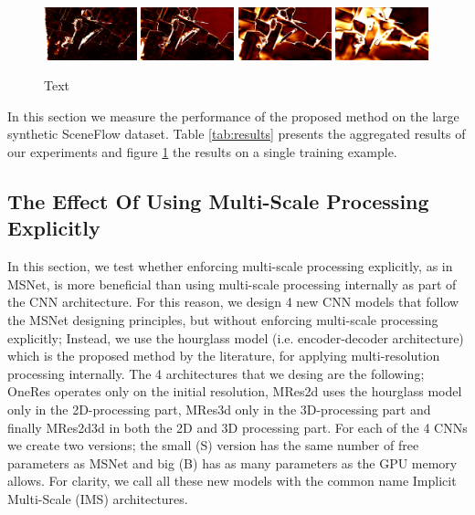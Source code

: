 \documentclass[runningheads]{llncs}
\begin{document}
\begin{figure}[t]
\begin{center}
        \includegraphics[width=0.24\textwidth,clip]{figures/pred_0_err.png}
        \includegraphics[width=0.24\textwidth,clip]{figures/pred_1_err.png}
        \includegraphics[width=0.24\textwidth,clip]{figures/pred_2_err.png}
        \includegraphics[width=0.24\textwidth,clip]{figures/pred_3_err.png}\\        
    \end{center}
    
    \caption{Text}
    \label{fig:EMAPs}
\end{figure}

In this section we measure the performance of the proposed method on the large synthetic SceneFlow dataset. Table \ref{tab:results} presents the aggregated results of our experiments and figure \ref{fig:EMAPs} the results on a single training example.

\subsection{The Effect Of Using Multi-Scale Processing Explicitly}

In this section, we test whether enforcing multi-scale processing explicitly, as in MSNet, is more beneficial than using multi-scale processing internally as part of the CNN architecture. For this reason, we design 4 new CNN models that follow the MSNet designing principles, but without enforcing multi-scale processing explicitly; Instead, we use the hourglass model (i.e. encoder-decoder architecture) which is the proposed method by the literature, for applying multi-resolution processing internally. The 4 architectures that we desing are the following; OneRes operates only on the initial resolution, MRes2d uses the hourglass model only in the 2D-processing part, MRes3d only in the 3D-processing part and finally MRes2d3d in both the 2D and 3D processing part. For each of the 4 CNNs we create two versions; the small (S) version has the same number of free parameters as MSNet and big (B) has as many parameters as the GPU memory allows. For clarity, we call all these new models with the common name Implicit Multi-Scale (IMS) architectures.
\end{document}
